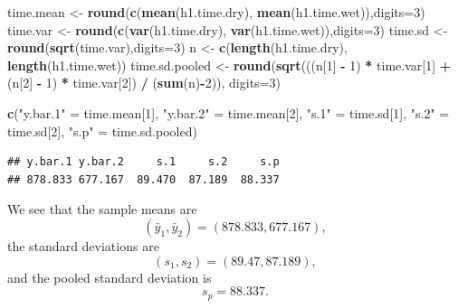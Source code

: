 \documentclass[
  11pt,
]{article}
\newenvironment{Shaded}{\begin{snugshade}}{\end{snugshade}}
\newcommand{\AttributeTok}[1]{\textcolor[rgb]{0.13,0.29,0.53}{#1}}
\newcommand{\DecValTok}[1]{\textcolor[rgb]{0.00,0.00,0.81}{#1}}
\newcommand{\FunctionTok}[1]{\textcolor[rgb]{0.13,0.29,0.53}{\textbf{#1}}}
\newcommand{\NormalTok}[1]{#1}
\newcommand{\OtherTok}[1]{\textcolor[rgb]{0.56,0.35,0.01}{#1}}
\newcommand{\SpecialCharTok}[1]{\textcolor[rgb]{0.81,0.36,0.00}{\textbf{#1}}}
\newcommand{\StringTok}[1]{\textcolor[rgb]{0.31,0.60,0.02}{#1}}
\begin{document}
\begin{Shaded}
\begin{Highlighting}[]
\NormalTok{time.mean }\OtherTok{\textless{}{-}} \FunctionTok{round}\NormalTok{(}\FunctionTok{c}\NormalTok{(}\FunctionTok{mean}\NormalTok{(h1.time.dry),}
               \FunctionTok{mean}\NormalTok{(h1.time.wet)),}\AttributeTok{digits=}\DecValTok{3}\NormalTok{)}
\NormalTok{time.var }\OtherTok{\textless{}{-}} \FunctionTok{round}\NormalTok{(}\FunctionTok{c}\NormalTok{(}\FunctionTok{var}\NormalTok{(h1.time.dry),}
              \FunctionTok{var}\NormalTok{(h1.time.wet)),}\AttributeTok{digits=}\DecValTok{3}\NormalTok{)}
\NormalTok{time.sd }\OtherTok{\textless{}{-}} \FunctionTok{round}\NormalTok{(}\FunctionTok{sqrt}\NormalTok{(time.var),}\AttributeTok{digits=}\DecValTok{3}\NormalTok{)}
\NormalTok{n }\OtherTok{\textless{}{-}} \FunctionTok{c}\NormalTok{(}\FunctionTok{length}\NormalTok{(h1.time.dry),}
       \FunctionTok{length}\NormalTok{(h1.time.wet))}
\NormalTok{time.sd.pooled }\OtherTok{\textless{}{-}}
  \FunctionTok{round}\NormalTok{(}\FunctionTok{sqrt}\NormalTok{(((n[}\DecValTok{1}\NormalTok{] }\SpecialCharTok{{-}} \DecValTok{1}\NormalTok{) }\SpecialCharTok{*}\NormalTok{ time.var[}\DecValTok{1}\NormalTok{] }\SpecialCharTok{+}\NormalTok{ (n[}\DecValTok{2}\NormalTok{] }\SpecialCharTok{{-}} \DecValTok{1}\NormalTok{) }\SpecialCharTok{*}\NormalTok{ time.var[}\DecValTok{2}\NormalTok{]) }\SpecialCharTok{/}\NormalTok{ (}\FunctionTok{sum}\NormalTok{(n)}\SpecialCharTok{{-}}\DecValTok{2}\NormalTok{)),}
        \AttributeTok{digits=}\DecValTok{3}\NormalTok{)}

\FunctionTok{c}\NormalTok{(}\StringTok{"y.bar.1"} \OtherTok{=}\NormalTok{ time.mean[}\DecValTok{1}\NormalTok{],}
  \StringTok{"y.bar.2"} \OtherTok{=}\NormalTok{ time.mean[}\DecValTok{2}\NormalTok{],}
  \StringTok{"s.1"} \OtherTok{=}\NormalTok{ time.sd[}\DecValTok{1}\NormalTok{],}
  \StringTok{"s.2"} \OtherTok{=}\NormalTok{ time.sd[}\DecValTok{2}\NormalTok{],}
  \StringTok{"s.p"} \OtherTok{=}\NormalTok{ time.sd.pooled)}
\end{Highlighting}
\end{Shaded}

\begin{verbatim}
## y.bar.1 y.bar.2     s.1     s.2     s.p 
## 878.833 677.167  89.470  87.189  88.337
\end{verbatim}

We see that the sample means are \[
  (\bar{y}_1,\bar{y}_2) = (878.833, 677.167),
\] the standard deviations are \[
  (s_1,s_2) = (89.47, 87.189),
\] and the pooled standard deviation is \[
  s_p = 88.337.
\]
\end{document}
